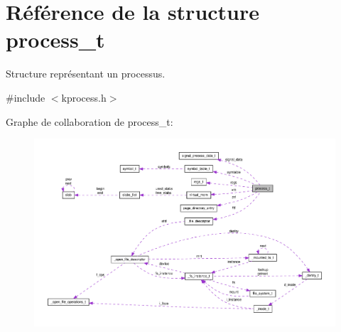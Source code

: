 \hypertarget{structprocess__t}{\section{Référence de la structure process\-\_\-t}
\label{structprocess__t}
}


Structure représentant un processus.  




{\ttfamily \#include $<$kprocess.\-h$>$}



Graphe de collaboration de process\-\_\-t\-:\nopagebreak
\begin{figure}[H]
\begin{center}
\leavevmode
\includegraphics[width=350pt]{structprocess__t__coll__graph}
\end{center}
\end{figure}
